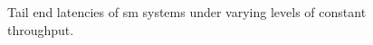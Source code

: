 \begin{figure}[p]
    \centering
    

    \caption[Experiment 2 - Tail end latencies of \gls{sm} systems under varying levels of constant throughput.]{Tail end latencies of \gls{sm} systems under varying levels of constant throughput.}
    
    \label{fig:exp:02:tail-latencies}
\end{figure}



